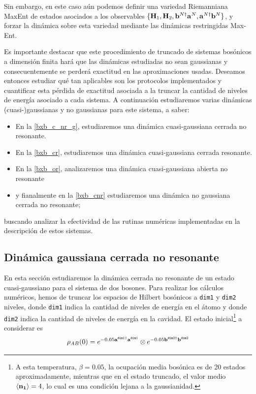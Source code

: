 \documentclass{report} %
\newcommand{\notamm}[1]{{\color{orange} [Comentario MM: #1]}}
\numberwithin{equation}{section}
\begin{document}
Sin embargo, en este caso aún podemos definir una variedad Riemanniana MaxEnt de estados asociados a los observables  $\{{\bf H}_1,{\bf H}_2,{\bf b}^{N\dagger}{\bf a}^{N},{\bf a}^{N\dagger}{\bf b}^{N}\}$, y forzar la dinámica sobre esta variedad mediante las dinámicas restringidas Max-Ent. 

Es importante destacar que este procedimiento de truncado de sistemas bosónicos a dimensión finita hará que las dinámicas estudiadas no sean gaussianas y consecuentemente se perderá exactitud en las aproximaciones usadas. 
Deseamos entonces estudiar qué tan aplicables son los protocolos implementados y cuantificar esta pérdida de exactitud asociada a la truncar la cantidad de niveles de energía asociado a cada sistema. A continuación estudiaremos varias dinámicas (cuasi-)gaussianas y no gaussianas para este sistema, a saber: 

\begin{itemize}
    \item En la \autoref{bxb_c_nr_g}, estudiaremos una dinámica cuasi-gaussiana cerrada no resonante.
    \item En la \autoref{bxb_cr}, estudiaremos una dinámica cuasi-gaussiana cerrada resonante.
    \item En la \autoref{bxb_or}, analizaremos una dinámica cuasi-gaussiana abierta no resonante
    \item y fianalmente en la  \autoref{bxb_cnr} estudiaremos una dinámica no gaussiana cerrada no resonante;
\end{itemize}

buscando analizar la efectividad de las rutinas numéricas implementadas en la descripción de estos sistemas. 


\clearpage

\subsection{Dinámica gaussiana cerrada no resonante}
\label{bxb_c_nr_g}

En esta sección estudiaremos la dinámica cerrada no resonante de un estado cuasi-gaussiano para el sistema de dos bosones. Para realizar los cálculos numéricos, hemos de truncar los espacios de Hilbert bosónicos a \texttt{dim1} y \texttt{dim2} niveles, donde \texttt{dim1} indica la cantidad de niveles de energía en el átomo y donde \texttt{dim2} indica la cantidad de niveles de energía en la cavidad. El estado inicial\footnote{A esta temperatura, $\beta=0.05$, la ocupación media bosónica es de 20 estados aproximadamente, mientras que en el estado truncado, el valor medio $\langle{\bf n_1} \rangle= 4$, lo cual es una condición lejana a la gaussianidad.} a considerar es 
\begin{equation}
\rho_{AB}(0) = e^{-0.05{\bf a}^{\texttt{dim1}\dagger} {\bf a}^{\texttt{dim1}}} \otimes e^{-0.05{\bf b}^{\texttt{dim2}\dagger} {\bf b}^{\texttt{dim2}}}
\label{model3.6_gaussian1}
\end{equation}
\end{document}
